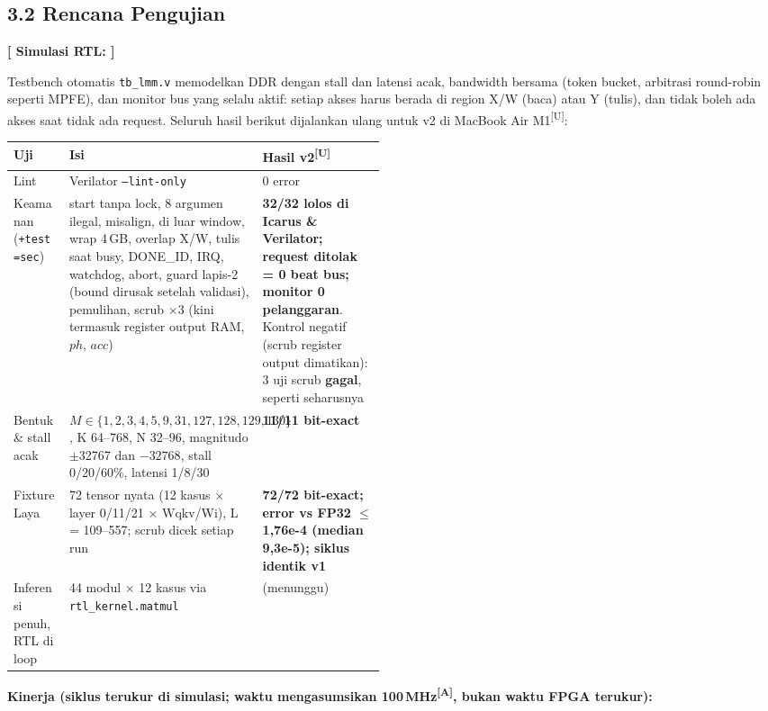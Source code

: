 \documentclass[10pt]{article}
\newcommand{\hd}[1]{\cellcolor{thg}\textbf{#1}}
\newcommand{\ok}[1]{\textcolor{ok}{\textbf{#1}}}
\newcommand{\bad}[1]{\textcolor{bad}{\textbf{#1}}}
\newcommand{\code}[1]{\texttt{\small #1}}
\newcommand{\lbl}[1]{\textbf{#1}\par}
\newcommand{\U}{\textsuperscript{[U]}}
\newcommand{\A}{\textsuperscript{[A]}}
\newcommand{\EeRtlResult}{(menunggu)}
\begin{document}
\subsection{3.2 Rencana Pengujian}

\lbl{[ Simulasi RTL: ]}
Testbench otomatis \code{tb\_lmm.v} memodelkan DDR dengan stall dan latensi acak, bandwidth bersama (token bucket, arbitrasi round-robin seperti MPFE), dan monitor bus yang selalu aktif: setiap akses harus berada di region X/W (baca) atau Y (tulis), dan tidak boleh ada akses saat tidak ada request. Seluruh hasil berikut dijalankan ulang untuk v2 di MacBook Air M1\U:

{\small
\begin{tabularx}{\linewidth}{|p{0.15\linewidth}|L|p{0.33\linewidth}|}
\hline
\hd{Uji} & \hd{Isi} & \hd{Hasil v2\U} \\ \hline
Lint & Verilator \code{--lint-only} & 0 error \\ \hline
Keamanan (\code{+test=sec}) & start tanpa lock, 8 argumen ilegal, misalign, di luar window, wrap 4\,GB, overlap X/W, tulis saat busy, DONE\_ID, IRQ, watchdog, abort, guard lapis-2 (bound dirusak setelah validasi), pemulihan, scrub $\times$3 (kini termasuk register output RAM, $ph$, $acc$) & \ok{32/32 lolos di Icarus \& Verilator; request ditolak = 0 beat bus; monitor 0 pelanggaran}. Kontrol negatif (scrub register output dimatikan): 3 uji scrub \bad{gagal}, seperti seharusnya \\ \hline
Bentuk \& stall acak & $M\in\{1,2,3,4,5,9,31,127,128,129,130\}$, K 64--768, N 32--96, magnitudo $\pm$32767 dan $-32768$, stall 0/20/60\%, latensi 1/8/30 & \ok{11/11 bit-exact} \\ \hline
Fixture Laya & 72 tensor nyata (12 kasus $\times$ layer 0/11/21 $\times$ Wqkv/Wi), L = 109--557; scrub dicek setiap run & \ok{72/72 bit-exact; error vs FP32 $\le$ 1,76e-4 (median 9,3e-5); siklus identik v1} \\ \hline
Inferensi penuh, RTL di loop & 44 modul $\times$ 12 kasus via \code{rtl\_kernel.matmul} & \EeRtlResult \\ \hline
\end{tabularx}}

\textbf{Kinerja (siklus terukur di simulasi; waktu mengasumsikan 100\,MHz\A, bukan waktu FPGA terukur):}
\end{document}
